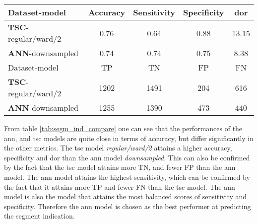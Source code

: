\begin{table*}
    \centering
    \begin{tabular}{lcccc}
        \toprule
        Dataset-model               & Accuracy & Sensitivity & Specificity & \acrshort{dor} \\
        \midrule
        \textbf{TSC}-regular/ward/2 &     0.76 &        0.64 &        0.88 & 13.15 \\
        \textbf{ANN}-downsampled    &     0.74 &        0.74 &        0.75 & 8.38 \\
        \midrule
        Dataset-model               &  TP  &  TN  &  FP  &  FN \\
        \midrule
        \textbf{TSC}-regular/ward/2 & 1202 & 1491 &  204 &  616 \\
        \textbf{ANN}-downsampled    & 1255 & 1390 &  473 &  440 \\
        \bottomrule
    \end{tabular}
    \caption{A table comparing the best contenders within each model group for predicting segment indication. 
             The top table compare the models by their accuracy, sensitivity, specificity and \acrshort{dor}, 
             and the bottom table shows the number of TPs, TNs, FPs and FNs that the different models attain.}
    \label{tab:segm_ind_compare}
\end{table*}

From table \ref{tab:segm_ind_compare} one can see that the performances of the \acrshort{ann}, and \acrshort{tsc} models are quite close in terms of accuracy, but differ significantly in the other metrics. The \acrshort{tsc} model \textit{regular/ward/2} attains a higher accuracy, specificity and \acrshort{dor} than the \acrshort{ann} model \textit{downsampled}. This can also be confirmed by the fact that the \acrshort{tsc} model attains more TN, and fewer FP than the \acrshort{ann} model.  The \acrshort{ann} model attains the highest sensitivity, which can be confirmed by the fact that it attains more TP and fewer FN than the \acrshort{tsc} model. The \acrshort{ann} model is also the model that attains the most balanced scores of sensitivity and specificity. Therefore the \acrshort{ann} model is chosen as the best performer at predicting the segment indication. 
